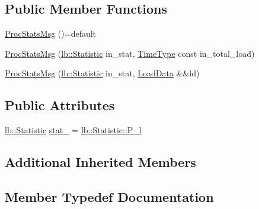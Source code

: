 \subsection*{Public Member Functions}
\begin{DoxyCompactItemize}
\item 
\hyperlink{structvt_1_1vrt_1_1collection_1_1balance_1_1_proc_stats_msg_a2466595ab497ed3f3e3fccb7ad6e3aa6}{Proc\+Stats\+Msg} ()=default
\item 
\hyperlink{structvt_1_1vrt_1_1collection_1_1balance_1_1_proc_stats_msg_ac4b5ac7c62b0485b23113a2eb3cef658}{Proc\+Stats\+Msg} (\hyperlink{namespacevt_1_1vrt_1_1collection_1_1lb_af0e20ef9afee77295053aa83bf1348b1}{lb\+::\+Statistic} in\+\_\+stat, \hyperlink{namespacevt_a876a9d0cd5a952859c72de8a46881442}{Time\+Type} const in\+\_\+total\+\_\+load)
\item 
\hyperlink{structvt_1_1vrt_1_1collection_1_1balance_1_1_proc_stats_msg_a11420fc6d4faf385291097c70aaac452}{Proc\+Stats\+Msg} (\hyperlink{namespacevt_1_1vrt_1_1collection_1_1lb_af0e20ef9afee77295053aa83bf1348b1}{lb\+::\+Statistic} in\+\_\+stat, \hyperlink{structvt_1_1vrt_1_1collection_1_1balance_1_1_load_data}{Load\+Data} \&\&ld)
\end{DoxyCompactItemize}
\subsection*{Public Attributes}
\begin{DoxyCompactItemize}
\item 
\hyperlink{namespacevt_1_1vrt_1_1collection_1_1lb_af0e20ef9afee77295053aa83bf1348b1}{lb\+::\+Statistic} \hyperlink{structvt_1_1vrt_1_1collection_1_1balance_1_1_proc_stats_msg_ae66687243df03f02aa5e0f5d884cc575}{stat\+\_\+} = \hyperlink{namespacevt_1_1vrt_1_1collection_1_1lb_af0e20ef9afee77295053aa83bf1348b1af76181d80de89c5736a21709e19caa61}{lb\+::\+Statistic\+::\+P\+\_\+l}
\end{DoxyCompactItemize}
\subsection*{Additional Inherited Members}


\subsection{Member Typedef Documentation}
\mbox{\label{structvt_1_1vrt_1_1collection_1_1balance_1_1_proc_stats_msg_a883f509d9a4ce6f095a9a680e5199cde}} 
